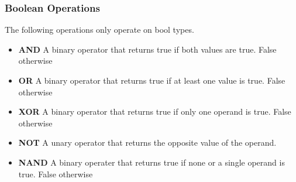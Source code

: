 \subsubsection{Boolean Operations}
\label{sec:boolOps}

The following operations only operate on bool types.

\begin{itemize}
  \item \textbf{AND} A binary operator that returns true if both values are true. False otherwise
  \item \textbf{OR} A binary operator that returns true if at least one value is true. False otherwise
  \item \textbf{XOR} A binary operator that returns true if only one operand is true. False otherwise
  \item \textbf{NOT} A unary operator that returns the opposite value of the operand.
  \item \textbf{NAND} A binary operater that returns true if none or a single operand is true. False otherwise
\end{itemize}
